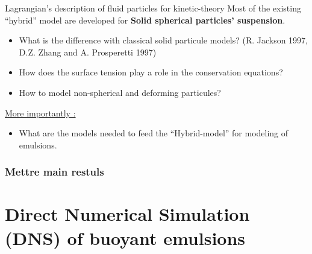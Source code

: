 \documentclass{sintefbeamer}
\begin{document}
\begin{frame}{Lagrangian's description of fluid particles for kinetic-theory}
  Most of the existing ``hybrid'' model are developed for \textbf{Solid spherical particles' suspension}. 
  \begin{itemize}
    \item What is the difference with classical solid particule models? (R. Jackson 1997, D.Z. Zhang and A. Prosperetti 1997)
    \item How does the surface tension play a role in the conservation equations? 
    \item How to model non-spherical and deforming particules?
  \end{itemize}  
  \pause
  \underline{More importantly :}
  \begin{itemize}
    \item What are the models needed to feed the ``Hybrid-model''  for modeling of emulsions. 
  \end{itemize}
\end{frame}


\begin{frame}
  \frametitle{Mettre main restuls}

  

\end{frame}
\section{Direct Numerical Simulation (DNS) of buoyant emulsions}
\section*{}
\end{document}

